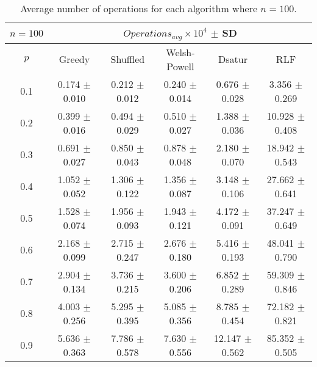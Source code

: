 \begin{table}[H]
    \centering
    \begin{tabular}{cccccc}
        
        $n = 100$& \multicolumn{5}{c}{$Operations_{avg}\times10^4$ $\pm$ SD} \\
        \hline
        $p$ & Greedy & Shuffled & Welsh-Powell & Dsatur & RLF \\
        \hline
        0.1 & 0.174 $\pm$ 0.010 & 0.212 $\pm$ 0.012 & 0.240 $\pm$ 0.014 & 0.676 $\pm$ 0.028 & 3.356 $\pm$ 0.269 \\
        0.2 & 0.399 $\pm$ 0.016 & 0.494 $\pm$ 0.029 & 0.510 $\pm$ 0.027 & 1.388 $\pm$ 0.036 & 10.928 $\pm$ 0.408 \\
        0.3 & 0.691 $\pm$ 0.027 & 0.850 $\pm$ 0.043 & 0.878 $\pm$ 0.048 & 2.180 $\pm$ 0.070 & 18.942 $\pm$ 0.543 \\
        0.4 & 1.052 $\pm$ 0.052 & 1.306 $\pm$ 0.122 & 1.356 $\pm$ 0.087 & 3.148 $\pm$ 0.106 & 27.662 $\pm$ 0.641 \\
        0.5 & 1.528 $\pm$ 0.074 & 1.956 $\pm$ 0.093 & 1.943 $\pm$ 0.121 & 4.172 $\pm$ 0.091 & 37.247 $\pm$ 0.649 \\
        0.6 & 2.168 $\pm$ 0.099 & 2.715 $\pm$ 0.247 & 2.676 $\pm$ 0.180 & 5.416 $\pm$ 0.193 & 48.041 $\pm$ 0.790 \\
        0.7 & 2.904 $\pm$ 0.134 & 3.736 $\pm$ 0.215 & 3.600 $\pm$ 0.206 & 6.852 $\pm$ 0.289 & 59.309 $\pm$ 0.846 \\
        0.8 & 4.003 $\pm$ 0.256 & 5.295 $\pm$ 0.395 & 5.085 $\pm$ 0.356 & 8.785 $\pm$ 0.454 & 72.182 $\pm$ 0.821 \\
        0.9 & 5.636 $\pm$ 0.363 & 7.786 $\pm$ 0.578 & 7.630 $\pm$ 0.556 & 12.147 $\pm$ 0.562 & 85.352 $\pm$ 0.505 \\
        \hline
    \end{tabular}
    \caption{Average number of operations for each algorithm where $n = 100$.}
    \label{tab:avgOpsforV100}
\end{table}

